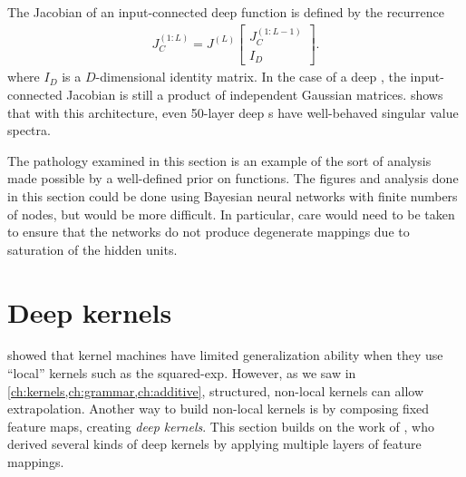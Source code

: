 The Jacobian of an input-connected deep function is defined by the recurrence
%
\newcommand{\sbi}[2]{\left[ \! \begin{array}{c} #1 \\ #2 \end{array} \! \right]} 
\begin{align}
{J_C^{(1:L)} = J^{(L)} \sbi{ J_C^{(1:L-1)}}{I_D}}.
\end{align}
%
%
%
where $I_D$ is a $D$-dimensional identity matrix.
In the case of a deep \gp{}, the input-connected Jacobian is still a product of independent Gaussian matrices.
 shows that with this architecture, even 50-layer deep \gp{}s have well-behaved singular value spectra.

The pathology examined in this section is an example of the sort of analysis made possible by a well-defined prior on functions.
The figures and analysis done in this section could be done using Bayesian neural networks with finite numbers of nodes, but would be more difficult.
In particular, care would need to be taken to ensure that the networks do not produce degenerate mappings due to saturation of the hidden units.





\section{Deep kernels}
\label{sec:deep_kernels}

\cite{ bengio2006curse} showed that kernel machines have limited generalization ability when they use ``local'' kernels such as the squared-exp.
However, as we saw in \cref{ch:kernels,ch:grammar,ch:additive}, structured, non-local kernels can 
allow extrapolation.
Another way to build non-local kernels is by composing fixed feature maps, creating \emph{deep kernels}.
This section builds on the work of \citet{cho2009kernel}, who derived several kinds of deep kernels by applying multiple layers of feature mappings.


